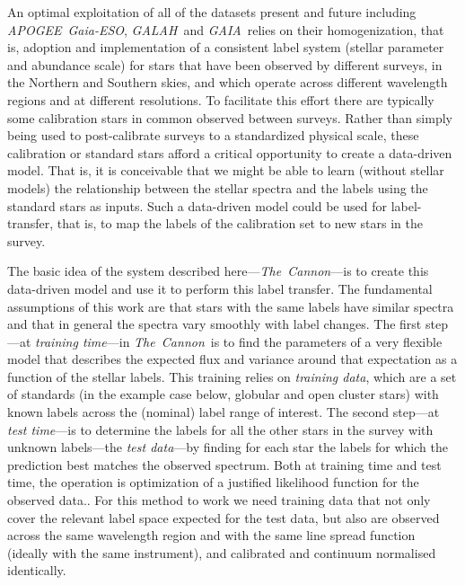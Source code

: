 \documentclass[12pt, preprint]{aastex}
\newcommand{\tc}{\textsl{The~Cannon}}
\newcommand{\apogee}{\textsl{APOGEE}}
\newcommand{\galah}{\textsl{GALAH}}
\newcommand{\gaiaeso}{\textsl{Gaia-ESO}}
\newcommand{\gaia}{\textsl{GAIA}}
\begin{document}
An optimal exploitation of all of the datasets present and future including \apogee\, \gaiaeso, \galah\ and \gaia\ relies on their homogenization, that is, adoption and implementation of a consistent label system (stellar parameter and abundance scale) for stars that have been observed by different surveys, in the Northern and Southern skies, and which operate across different wavelength regions and at different resolutions. To facilitate this effort there are typically some calibration stars in common observed between surveys. Rather than simply being used to post-calibrate surveys to a standardized physical scale, these calibration or standard stars afford a critical opportunity to create a data-driven model.  That is, it is conceivable that we might be able to learn (without stellar models) the relationship between the stellar spectra and the labels using the standard stars as inputs. Such a data-driven model could be used for label-transfer, that is, to map the labels of the calibration set to new stars in the survey.

The basic idea of the system described here---\tc---is to create this data-driven model and use it to perform this label transfer.  The fundamental assumptions of this work are that stars with the same labels have similar spectra and that in general the spectra vary smoothly with label changes. The first step---at \emph{training time}---in \tc\ is to find the parameters of a very flexible model that describes the expected flux and variance around that expectation as a function of the stellar labels. This training relies on \emph{training data}, which are a set of standards (in the example case below, globular and open cluster stars) with known labels across the (nominal) label range of interest. The second step---at \emph{test time}---is to determine the labels for all the other stars in the survey with unknown labels---the \emph{test data}---by finding for each star the labels for which the prediction best matches the observed spectrum.  Both at training time and test time, the operation is optimization of a justified likelihood function for the observed data..
For this method to work we need training data that not only cover the relevant label space expected for the test data, but also are observed across the same wavelength region and with the same line spread function (ideally with the same instrument), and calibrated and continuum normalised identically.
\end{document}
